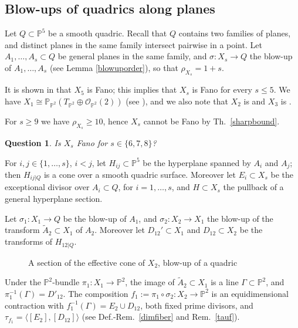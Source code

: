 \documentclass[a4paper,12pt]{amsart}
\newtheorem{question}[thm]{Question}
\theoremstyle{definition}
\numberwithin{figure}{section}
\numberwithin{table}{section}
\newcommand{\w}{\widetilde}
\newcommand{\ol}{\mathcal{O}}
\newcommand{\pr}{\mathbb{P}}
\begin{document}
\subsection{Blow-ups of quadrics along planes}\label{quadrics}
\noindent Let $Q\subset\pr^5$ be a smooth quadric. Recall that $Q$ contains two families of planes, and distinct planes in the same family intersect pairwise in a point. Let $A_1,\dotsc,A_s\subset Q$ be general planes in the same family, and $\sigma\colon X_s\to Q$ the blow-up of $A_1,\dotsc,A_s$ (see Lemma \ref{blowuporder}), so that $\rho_{X_s}=1+s$.

It is shown in 
\cite{manivel4fold} that $X_5$ is Fano; this implies that $X_s$ is Fano for every $s\leq 5$.
We have  $X_1\cong\pr_{\pr^2}(T_{\pr^2}\oplus\ol_{\pr^2}(2))$ (see \cite[Theorem on first page]{szurekwisnnagoya}), and we also note that $X_2$ is \cite[Fano 3-2]{FTT} and $X_3$ is \cite[Fano 4-2]{FTT}.

For $s\geq 9$ we have $\rho_{X_s}\geq 10$, hence $X_s$ cannot be Fano by Th.~\ref{sharpbound}.
 \begin{question}\label{questionquadric}
    Is $X_s$ Fano for $s\in\{6,7,8\}$?
  \end{question}
  
 For $i,j\in\{1,\dotsc,s\}$, $i<j$, let   $H_{ij}\subset\pr^5$ be the hyperplane spanned by  $A_i$ and $A_j$; then $H_{ij|Q}$ is
 a cone over a smooth quadric surface.
Moreover let $E_i\subset X_s$ be the exceptional divisor over $A_i\subset Q$, for $i=1,\dotsc,s$, and $H\subset X_s$ the pullback of a general hyperplane section.
 
  \smallskip

Let $\sigma_1\colon X_1\to Q$ be the blow-up of $A_1$, and $\sigma_2\colon X_2\to X_1$ the blow-up of the transform $\w{A}_2\subset X_1$ of $A_2$.
Moreover let $D_{12}'\subset X_1$ and
$D_{12}\subset X_2$  be the transforms of $H_{12|Q}$.

\begin{figure}[b]\caption{A section of the effective cone of $X_2$, blow-up of a quadric}\label{figuraX2}

\bigskip
  

\end{figure}

Under the $\pr^2$-bundle $\pi_1\colon X_1\to\pr^2$, the image of $\w{A}_2\subset X_1$ is a line $\Gamma\subset\pr^2$, and $\pi_1^{-1}(\Gamma)=D'_{12}$. The composition $f_1:=\pi_1\circ\sigma_2\colon X_2\to\pr^2$ is an equidimensional contraction with $f_1^{-1}(\Gamma)=E_2\cup D_{12}$, both fixed prime divisors, and $\tau_{f_1}=\langle [E_2],[D_{12}]\rangle$ (see Def.-Rem.~\ref{dimfiber} and Rem.~\ref{tauf}).
\end{document}
